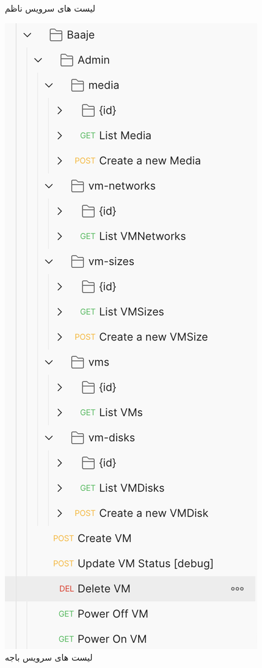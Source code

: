 \begin{figure}
\begin{minipage}[b]{0.45\textwidth}
		\caption{لیست های سرویس ناظم}
		\label{fig:nazem-api}
	\end{minipage}
	\hfill
	\begin{minipage}[b]{0.45\textwidth}
		\includegraphics[width=\textwidth]{figures/baaje-api.png}
\caption{لیست های سرویس باجه}
\label{fig:baaje-api}
	\end{minipage}
	
\end{figure}


